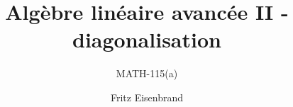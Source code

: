 \documentclass[aspectratio=169,xcolor=dvipsnames,noframenumbering,frenchyn]{beamer}
\title{Algèbre linéaire avancée II - diagonalisation}
\subtitle{ MATH-115(a) }
\author[Eisenbrand]{Fritz Eisenbrand}
\date{}
\begin{document}
\begin{frame}[plain]
    \titlepage
\end{frame}



\pagestyle{empty} 

%
%
 
\end{document}
